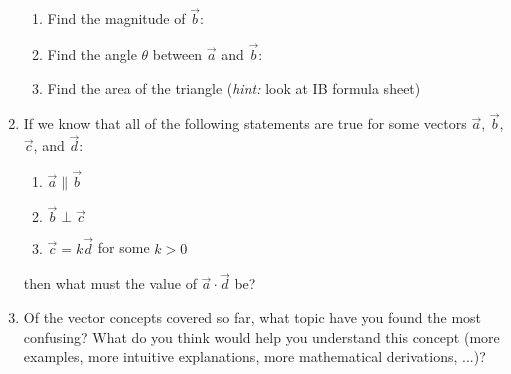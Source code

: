 \documentclass[12pt, twoside]{article}
\begin{document}
\begin{enumerate}[itemsep=1cm]
\begin{enumerate}
        \item Find the magnitude of $\vec{b}$:

        \vspace{2cm}
        
        \item Find the angle $\theta$ between $\vec{a}$ and $\vec{b}$:

        \vspace{2cm}

        \item Find the area of the triangle (\emph{hint:} look at IB formula sheet)
    \end{enumerate}

    \newpage

    \item If we know that all of the following statements are true for some vectors $\vec{a}$, $\vec{b}$, $\vec{c}$, and $\vec{d}$:
    \begin{enumerate}
        \item $\vec{a} \parallel \vec{b}$
        \item $\vec{b} \perp \vec{c}$
        \item $\vec{c} = k\vec{d}$ for some $k > 0$
    \end{enumerate}
    
    
    then what must the value of $\vec{a} \cdot \vec{d}$ be?

    \vspace{3cm}

    \item Of the vector concepts covered so far, what topic have you found the most confusing? What do you think would help you understand this concept (more examples, more intuitive explanations, more mathematical derivations, ...)?
    
\end{enumerate}
\end{document}
